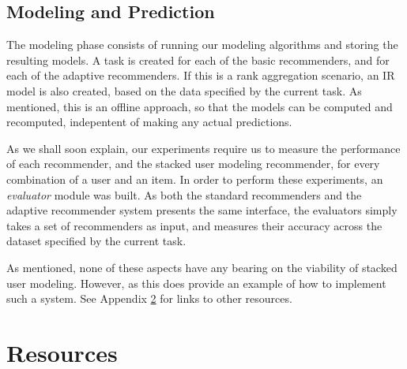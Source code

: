 \section{Modeling and Prediction}

The modeling phase consists of running our modeling algorithms and storing the resulting models.
A task is created for each of the basic recommenders, and for each of the adaptive recommenders.
If this is a rank aggregation scenario, an IR model is also created, based on the data
specified by the current task.
As mentioned, this is an offline approach, so that the models can be computed and recomputed,
indepentent of making any actual predictions.

As we shall soon explain, our experiments require us to measure the performance of each
recommender, and the stacked user modeling recommender, for every combination of 
a user and an item.
In order to perform these experiments, an \emph{evaluator} module was built.
As both the standard recommenders and the adaptive recommender system presents the same 
interface, the evaluators simply takes a set of recommenders as input, 
and measures their accuracy across the dataset specified by the current task.

As mentioned, none of these aspects have any bearing on the viability of stacked user modeling.
However, as this does provide an example of how to implement such a system. 
See Appendix \ref{appendix:resources} for links to other resources. 

\chapter{Resources}
\label{appendix:resources}

